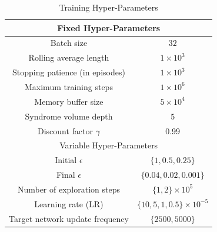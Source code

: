 \documentclass[twocolumn,preprintnumbers,amsmath,amssymb,notitlepage,nofootinbib,longbibliography,superscriptaddress,aps,pra,10pt]{revtex4-1}
\begin{document}
	\begin{table}
	\begin{center}
	  \begin{tabular}{| c | c | }
	    \hline
	    \multicolumn{2}{|c|}{Fixed Hyper-Parameters} \\
	    \hline
	    Batch size & $32$  \\
	    Rolling average length & $1\times10^3$ \\
	    Stopping patience (in episodes) & $1\times10^3$  \\
	    Maximum training steps & $1\times10^6$  \\
	    Memory buffer size & $5\times 10^4$ \\
	    Syndrome volume depth & $5$ \\
	    Discount factor $\gamma$ & 0.99 \\
	    \hline
	    \multicolumn{2}{|c|}{Variable Hyper-Parameters} \\
	    \hline
	    Initial $\epsilon$ & $\{1, 0.5, 0.25\}$ \\
	    Final $\epsilon$ & $\{0.04, 0.02, 0.001\}$  \\
	    Number of exploration steps & $\{1,2\}\times10^5$  \\
	    Learning rate (LR)& $\{10,5,1,0.5\}\times10^{-5}$  \\
	    Target network update frequency & $\{2500, 5000\}$ \\
	    \hline
	  \end{tabular}\caption{Training Hyper-Parameters}\label{t:hyper_parameters}
	\end{center}
	\end{table}
\end{document}
